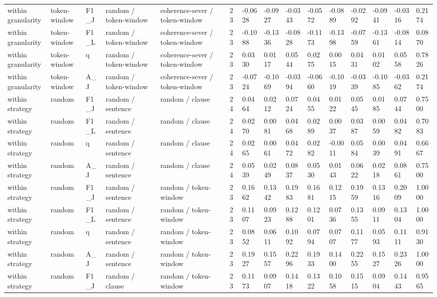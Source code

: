 \begin{table}[t]
{\begin{tabular}{lllllllllllllll}
within granularity & token-window & F1\_J & random / token-window & coherence-sever / token-window & 23 & -0.0628 & -0.0927 & -0.0343 & -0.0572 & -0.0889 & -0.0292 & -0.0941 & -0.0316 & 0.2174 \\
within granularity & token-window & F1\_L & random / token-window & coherence-sever / token-window & 23 & -0.1088 & -0.1336 & -0.0828 & -0.1173 & -0.1398 & -0.0759 & -0.1361 & -0.0814 & 0.0870 \\
within granularity & token-window & q & random / token-window & coherence-sever / token-window & 23 & 0.0330 & 0.0117 & 0.0544 & 0.0275 & 0.0015 & 0.0431 & 0.0102 & 0.0558 & 0.7826 \\
within granularity & token-window & A\_J & random / token-window & coherence-sever / token-window & 23 & -0.0724 & -0.1069 & -0.0394 & -0.0660 & -0.1019 & -0.0339 & -0.1085 & -0.0362 & 0.2174 \\
within strategy & random & F1\_J & random / sentence & random / clause & 24 & 0.0464 & 0.0212 & 0.0724 & 0.0455 & 0.0122 & 0.0545 & 0.0185 & 0.0744 & 0.7500 \\
within strategy & random & F1\_L & random / sentence & random / clause & 24 & 0.0270 & 0.0081 & 0.0468 & 0.0289 & 0.0037 & 0.0387 & 0.0059 & 0.0482 & 0.7083 \\
within strategy & random & q & random / sentence & random / clause & 24 & 0.0265 & 0.0061 & 0.0472 & 0.0282 & -0.0011 & 0.0584 & 0.0039 & 0.0491 & 0.6667 \\
within strategy & random & A\_J & random / sentence & random / clause & 24 & 0.0539 & 0.0249 & 0.0837 & 0.0530 & 0.0143 & 0.0622 & 0.0218 & 0.0861 & 0.7500 \\
within strategy & random & F1\_J & random / sentence & random / token-window & 23 & 0.1662 & 0.1342 & 0.1983 & 0.1681 & 0.1215 & 0.1959 & 0.1316 & 0.2009 & 1.0000 \\
within strategy & random & F1\_L & random / sentence & random / token-window & 23 & 0.1107 & 0.0923 & 0.1288 & 0.1201 & 0.0736 & 0.1355 & 0.0911 & 0.1304 & 1.0000 \\
within strategy & random & q & random / sentence & random / token-window & 23 & 0.0852 & 0.0611 & 0.1092 & 0.0794 & 0.0707 & 0.1177 & 0.0593 & 0.1111 & 0.9130 \\
within strategy & random & A\_J & random / sentence & random / token-window & 23 & 0.1927 & 0.1557 & 0.2296 & 0.1933 & 0.1400 & 0.2255 & 0.1527 & 0.2326 & 1.0000 \\
within strategy & random & F1\_J & random / clause & random / token-window & 23 & 0.1173 & 0.0907 & 0.1418 & 0.1322 & 0.1058 & 0.1515 & 0.0904 & 0.1443 & 0.9565 \\

\end{tabular}}
\end{table}
